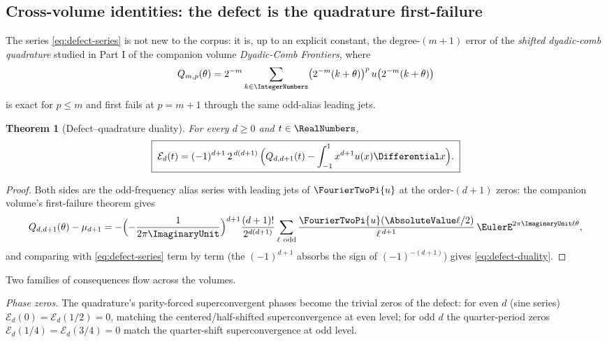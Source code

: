 \documentclass[11pt,oneside]{article}
\numberwithin{equation}{section}
\newtheorem{theorem}{Theorem}[section]
\theoremstyle{definition}
\theoremstyle{remark}
\begin{document}
\subsection{Cross-volume identities: the defect is the quadrature
first-failure}
\label{sec:defect-crosswalk}

The series \eqref{eq:defect-series} is not new to the corpus: it is,
up to an explicit constant, the degree-$(m{+}1)$ error of the
\emph{shifted dyadic-comb quadrature} studied in Part I of the
companion volume \emph{Dyadic-Comb Frontiers}, where
\[
 Q_{m,p}(\theta)
 =2^{-m}\sum_{k\in\IntegerNumbers}
 \bigl(2^{-m}(k+\theta)\bigr)^{p}\,
 u\bigl(2^{-m}(k+\theta)\bigr)
\]
is exact for $p\le m$ and first fails at $p=m+1$ through the same
odd-alias leading jets.

\begin{theorem}[Defect--quadrature duality]
\label{thm:defect-duality}
For every $d\ge0$ and $t\in\RealNumbers$,
\begin{equation}
 \boxed{\;
 \mathcal E_d(t)
 =(-1)^{d+1}\,2^{\,d(d+1)}\,
 \Bigl(Q_{d,d+1}(t)-\int_{-1}^{1}x^{d+1}u(x)\Differential x\Bigr).
 \;}
 \label{eq:defect-duality}
\end{equation}
\end{theorem}

\begin{proof}
Both sides are the odd-frequency alias series with leading jets of
$\FourierTwoPi{u}$ at the order-$(d{+}1)$ zeros: the companion volume's
first-failure theorem gives
\[
 Q_{d,d+1}(\theta)-\mu_{d+1}
 =-\Bigl(-\frac1{2\pi\ImaginaryUnit}\Bigr)^{d+1}
 \frac{(d+1)!}{2^{d(d+1)}}
 \sum_{\ell\ \mathrm{odd}}
 \frac{\FourierTwoPi{u}(\AbsoluteValue\ell/2)}{\ell^{\,d+1}}\,
 \EulerE^{2\pi\ImaginaryUnit\ell\theta},
\]
and comparing with \eqref{eq:defect-series} term by term (the
$(-1)^{d+1}$ absorbs the sign of $(-1)^{-(d+1)}$) gives
\eqref{eq:defect-duality}.
\end{proof}

Two families of consequences flow across the volumes.

\emph{Phase zeros.}  The quadrature's parity-forced superconvergent
phases become the trivial zeros of the defect: for even $d$
(sine series) $\mathcal E_d(0)=\mathcal E_d(1/2)=0$, matching the
centered/half-shifted superconvergence at even level; for odd $d$ the
quarter-period zeros $\mathcal E_d(1/4)=\mathcal E_d(3/4)=0$ match
the quarter-shift superconvergence at odd level.
\end{document}
